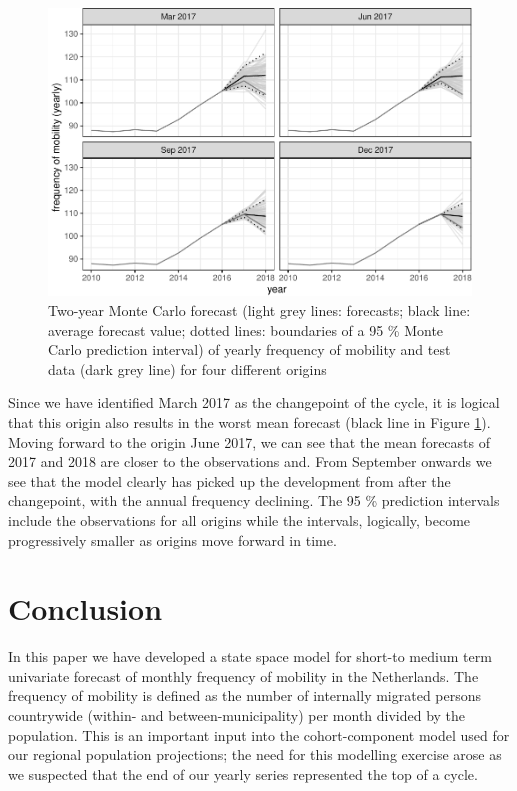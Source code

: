 \documentclass[12pt, a4paper]{article}
\begin{document}
\begin{figure}[H]
  \caption{\label{fig:forecast-2017}Two-year Monte Carlo forecast (light grey lines: forecasts; black line: average forecast value; dotted lines: boundaries of a 95 \% Monte Carlo prediction interval) of yearly frequency of mobility and test data (dark grey line) for four different origins}
\centering
\includegraphics[scale = 0.8]{../figs/freq--mc-intervals-1.pdf}
\end{figure}

Since we have identified March 2017 as the changepoint of the cycle, it is logical that this origin also results in the worst mean forecast (black line in Figure \ref{fig:forecast-2017}).  Moving forward to the origin June 2017, we can see that the mean forecasts of 2017 and 2018 are closer to the observations and. From September onwards we see that the model clearly has picked up the development from after the changepoint, with the annual frequency declining. The 95 \% prediction intervals include the observations for all origins while the intervals, logically, become progressively smaller as origins move forward in time.

\section{Conclusion}\label{conclusion}

In this paper we have developed a state space model for short-to medium
term univariate forecast of monthly frequency of mobility in the
Netherlands. The frequency of mobility is defined as the number of
internally migrated persons countrywide (within- and
between-municipality) per month divided by the population. This is an
important input into the cohort-component model used for our regional
population projections; the need for this modelling exercise arose as we
suspected that the end of our yearly series represented the top of a
cycle.
\end{document}
